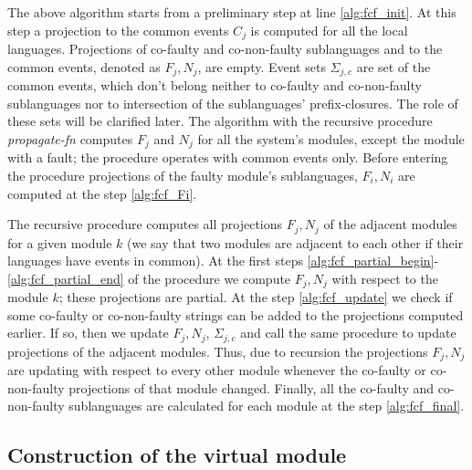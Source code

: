 \documentclass[a4paper, 10pt, conference]{ieeeconf}
\begin{document}
The above algorithm starts from a preliminary step at line \ref{alg:fcf_init}.
At this step a projection to the common events $C_j$ is computed for all the
local languages. Projections of co-faulty and co-non-faulty sublanguages and
to the common events, denoted as $F_j, N_j$, are empty. Event sets
$\Sigma_{j,c}$ are set of the common events, which don't belong neither to co-faulty and
co-non-faulty sublanguages nor to intersection of the sublanguages'
prefix-closures. The role of these sets will be clarified later.
The algorithm with the recursive procedure \emph{propagate-fn} computes $F_j$
and $N_j$ for all the system's modules, except the module with a fault; the
procedure operates with common events only. Before entering the procedure 
projections of the faulty module's sublanguages, $F_i, N_i$ are computed at the
step \ref{alg:fcf_Fi}.

The recursive procedure computes all projections $F_j, N_j$ of the adjacent
modules for a given module $k$ (we say that two modules are adjacent to each
other if their languages have events in common). At the first steps
\ref{alg:fcf_partial_begin}-\ref{alg:fcf_partial_end} of the
procedure we compute $F_j, N_j$ with respect to the module $k$; these
projections are partial. At the step \ref{alg:fcf_update} we check if some
co-faulty or co-non-faulty strings can be added to the projections computed
earlier. If so, then we update $F_j, N_j$, $\Sigma_{j,c}$ and call the same
procedure to update projections of the adjacent modules. Thus, due to recursion
the projections $F_j, N_j$ are updating with respect to every other module
whenever the co-faulty or co-non-faulty projections of that module changed.
Finally, all the co-faulty and co-non-faulty sublanguages are calculated
for each module at the step \ref{alg:fcf_final}.



\subsection{Construction of the virtual module}
\end{document}
